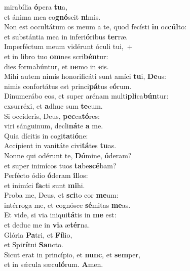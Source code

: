 \oddverse  mirabília \textbf{ó}pera \textbf{tu}a,~\*\\
\oddverse et ánima mea co\textbf{gnó}scit \textbf{ni}mis.\\
\evenverse Non est occultátum os meum a te, quod fecísti \textbf{in} oc\textbf{cúl}to:~\*\\
\evenverse et substántia mea in inferi\textbf{ó}ribus \textbf{ter}ræ.\\
\oddverse Imperféctum meum vidérunt óculi tui,~+\\
\oddverse  et in libro tuo \textbf{om}nes scri\textbf{bén}tur:~\*\\
\oddverse dies formabúntur, et \textbf{ne}mo in \textbf{e}is.\\
\evenverse Mihi autem nimis honorificáti sunt amíci \textbf{tu}i, \textbf{De}us:~\*\\
\evenverse nimis confortátus est princi\textbf{pá}tus e\textbf{ó}rum.\\
\oddverse Dinumerábo eos, et super arénam multi\textbf{pli}ca\textbf{bún}tur:~\*\\
\oddverse exsurréxi, et \textbf{a}dhuc sum \textbf{te}cum.\\
\evenverse Si occíderis, Deus, \textbf{pec}ca\textbf{tó}res:~\*\\
\evenverse viri sánguinum, decli\textbf{ná}te \textbf{a} me.\\
\oddverse Quia dícitis in cogi\textbf{ta}ti\textbf{ó}ne:~\*\\
\oddverse Accípient in vanitáte civi\textbf{tá}tes \textbf{tu}as.\\
\evenverse Nonne qui odérunt te, \textbf{Dó}mine, \textbf{ó}deram?~\*\\
\evenverse et super inimícos tuos \textbf{ta}be\textbf{scé}bam?\\
\oddverse Perfécto ódio \textbf{ó}deram \textbf{il}los:~\*\\
\oddverse et inimíci \textbf{fa}cti sunt \textbf{mi}hi.\\
\evenverse Proba me, Deus, et \textbf{sci}to cor \textbf{me}um:~\*\\
\evenverse intérroga me, et cognósce \textbf{sé}mitas \textbf{me}as.\\
\oddverse Et vide, si via iniqui\textbf{tá}tis in \textbf{me} est:~\*\\
\oddverse et deduc me in \textbf{vi}a æ\textbf{tér}na.\\
\evenverse Glória \textbf{Pa}tri, et \textbf{Fí}lio,~\*\\
\evenverse et Spi\textbf{rí}tui \textbf{San}cto.\\
\oddverse Sicut erat in princípio, et \textbf{nunc}, et \textbf{sem}per,~\*\\
\oddverse et in sǽcula sæcu\textbf{ló}rum. \textbf{A}men.\\

